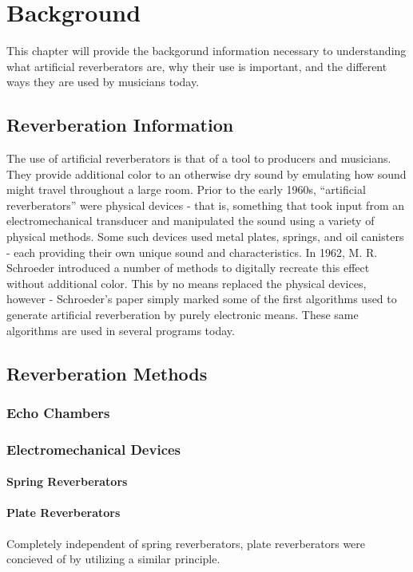 \chapter{Background}
\hspace*{-0.155cm}This chapter will provide the backgorund information necessary to understanding what artificial reverberators are, why their use is important, and the different ways they are used by musicians today.

\section{Reverberation Information}
The use of artificial reverberators is that of a tool to producers and musicians. They provide additional color to an otherwise dry sound by emulating how sound might travel throughout a large room. Prior to the early 1960s, ``artificial reverberators'' were physical devices - that is, something that took input from an electromechanical transducer and manipulated the sound using a variety of physical methods. Some such devices used metal plates, springs, and oil canisters - each providing their own unique sound and characteristics. In 1962, M. R. Schroeder introduced a number of methods to digitally recreate this effect without additional color. This by no means replaced the physical devices, however - Schroeder's paper simply marked some of the first algorithms used to generate artificial reverberation by purely electronic means. These same algorithms are used in several programs today.

\section{Reverberation Methods}

\subsection{Echo Chambers}

\subsection{Electromechanical Devices}
\subsubsection{Spring Reverberators}
\subsubsection{Plate Reverberators}
Completely independent of spring reverberators, plate reverberators were concieved of by utilizing a similar principle.

